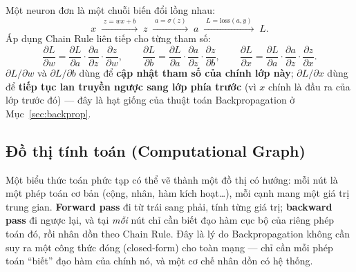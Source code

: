 \documentclass[12pt,a4paper]{report}
\begin{document}
Một neuron đơn là một chuỗi biến đổi lồng nhau:
$$x \;\xrightarrow{\;z=wx+b\;}\; z \;\xrightarrow{\;a=\sigma(z)\;}\; a \;\xrightarrow{\;L=\mathrm{loss}(a,y)\;}\; L.$$
Áp dụng Chain Rule liên tiếp cho từng tham số:
$$\frac{\partial L}{\partial w} = \frac{\partial L}{\partial a}\cdot\frac{\partial a}{\partial z}\cdot\frac{\partial z}{\partial w}, \qquad
\frac{\partial L}{\partial b} = \frac{\partial L}{\partial a}\cdot\frac{\partial a}{\partial z}\cdot\frac{\partial z}{\partial b}, \qquad
\frac{\partial L}{\partial x} = \frac{\partial L}{\partial a}\cdot\frac{\partial a}{\partial z}\cdot\frac{\partial z}{\partial x}.$$
$\partial L/\partial w$ và $\partial L/\partial b$ dùng để \textbf{cập nhật
tham số của chính lớp này}; $\partial L/\partial x$ dùng để \textbf{tiếp
tục lan truyền ngược sang lớp phía trước} (vì $x$ chính là đầu ra của lớp
trước đó) --- đây là hạt giống của thuật toán Backpropagation ở
Mục~\ref{sec:backprop}.

\subsection{Đồ thị tính toán (Computational Graph)}
\label{sec:compgraph}

Một biểu thức toán phức tạp có thể vẽ thành một đồ thị có hướng: mỗi nút là
một phép toán cơ bản (cộng, nhân, hàm kích hoạt\ldots), mỗi cạnh mang một
giá trị trung gian. \textbf{Forward pass} đi từ trái sang phải, tính từng
giá trị; \textbf{backward pass} đi ngược lại, và tại \emph{mỗi} nút chỉ cần
biết đạo hàm cục bộ của riêng phép toán đó, rồi nhân dồn theo Chain Rule.
Đây là lý do Backpropagation không cần suy ra một công thức đóng
(closed-form) cho toàn mạng --- chỉ cần mỗi phép toán ``biết'' đạo hàm của
chính nó, và một cơ chế nhân dồn có hệ thống.
\end{document}
